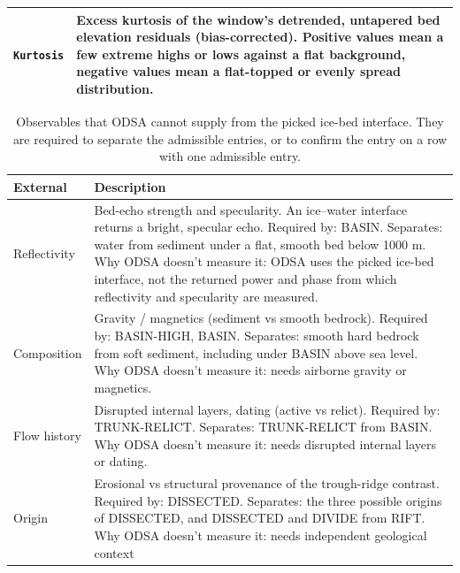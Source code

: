 \begin{table}
\begin{tabularx}{\textwidth}{p{4.0cm} X}
  \addlinespace[0.5em]
  \texttt{Kurtosis} & Excess kurtosis of the window's detrended, untapered bed elevation residuals (bias-corrected). Positive values mean a few extreme highs or lows against a flat background, negative values mean a flat-topped or evenly spread distribution.\\
\bottomrule
\end{tabularx}
\end{table}

\begin{table}
\centering
\caption{Observables that ODSA cannot supply from the picked ice-bed interface. They are required to separate the admissible entries, or to confirm the entry on a row with one admissible entry.}
\label{tab:externals}
\begin{tabularx}{\textwidth}{p{4.0cm} X}
\toprule
\textbf{External} & \textbf{Description} \\
\midrule
  Reflectivity & Bed-echo strength and specularity. An ice–water interface returns a bright, specular echo. Required by: BASIN. Separates: water from sediment under a flat, smooth bed below 1000 m. Why ODSA doesn't measure it: ODSA uses the picked ice-bed interface, not the returned power and phase from which reflectivity and specularity are measured. \\
  \addlinespace[0.5em]
  Composition & Gravity / magnetics (sediment vs smooth bedrock). Required by: BASIN-HIGH, BASIN. Separates: smooth hard bedrock from soft sediment, including under BASIN above sea level. Why ODSA doesn't measure it: needs airborne gravity or magnetics.\\
  \addlinespace[0.5em]
  Flow history & Disrupted internal layers, dating (active vs relict). Required by: TRUNK-RELICT. Separates: TRUNK-RELICT from BASIN. Why ODSA doesn't measure it: needs disrupted internal layers or dating. \\
  \addlinespace[0.5em]
  Origin & Erosional vs structural provenance of the trough-ridge contrast. Required by: DISSECTED. Separates: the three possible origins of DISSECTED, and DISSECTED and DIVIDE from RIFT. Why ODSA doesn't measure it: needs independent geological context\\
\bottomrule
\end{tabularx}
\end{table}